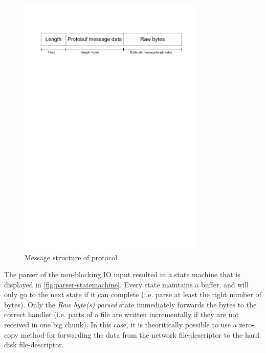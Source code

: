 \documentclass[12pt,a4paper]{scrartcl}
\begin{document}
\begin{figure}[H]
\centering
\includegraphics[width=0.8\textwidth,trim=0 23cm 0 3cm,clip=true]{diagrams/message-structure.pdf}
\caption{Message structure of protocol.}
\label{fig:message-structure}
\end{figure}

The parser of the non-blocking IO input resulted in a state machine that is displayed in \autoref{fig:parser-statemachine}. Every state maintains a buffer, and will only go to the next state if it can complete (i.e. parse at least the right number of bytes). Only the \emph{Raw byte(s) parsed} state immediately forwards the bytes to the correct handler (i.e. parts of a file are written incrementally if they are not received in one big chunk). In this case, it is theoritically possible to use a zero-copy method for forwarding the data from the network file-descriptor to the hard disk file-descriptor.
\end{document}
